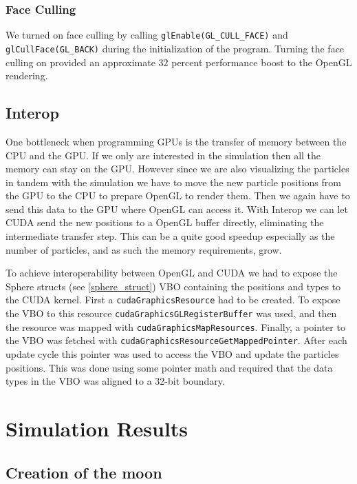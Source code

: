 \documentclass[a4paper]{article}
\begin{document}
\subsubsection{Face Culling}

We turned on face culling by calling \verb|glEnable(GL_CULL_FACE)| and \verb|glCullFace(GL_BACK)| during the initialization of the program. 
Turning the face culling on provided an approximate $32$ percent performance boost to the OpenGL rendering. 

  

\subsection{Interop}

One bottleneck when programming GPUs is the transfer of memory between the CPU and the GPU. 
If we only are interested in the simulation then all the memory can stay on the GPU. 
However since we are also visualizing the particles in tandem with the simulation we have to move the new particle positions from the GPU to the CPU to prepare OpenGL to render them. 
Then we again have to send this data to the GPU where OpenGL can access it. 
With Interop we can let CUDA send the new positions to a OpenGL buffer directly, eliminating the intermediate transfer step. 
This can be a quite good speedup especially as the number of particles, and as such the memory requirements, grow. 

To achieve interoperability between OpenGL and CUDA we had to expose the Sphere structs (see \ref{sphere_struct}) VBO containing the positions and types to the CUDA kernel. 
First a \verb|cudaGraphicsResource| had to be created. 
To expose the VBO to this resource \verb|cudaGraphicsGLRegisterBuffer| was used, and then the resource was mapped with \verb|cudaGraphicsMapResources|. 
Finally, a pointer to the VBO was fetched with \verb|cudaGraphicsResourceGetMappedPointer|. 
After each update cycle this pointer was used to access the VBO and update the particles positions. 
This was done using some pointer math and required that the data types in the VBO was aligned to a 32-bit boundary. 

\section{Simulation Results}

\subsection{Creation of the moon}
\end{document}
